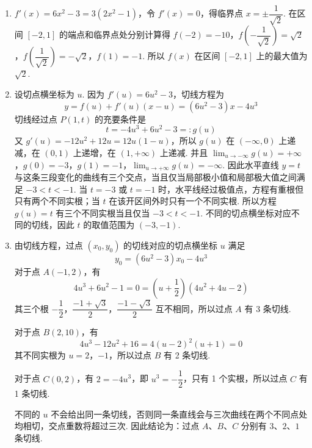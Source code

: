 \begin{solution}
\begin{enumerate}
\item \(f'(x)=6x^2-3=3(2x^2-1)\)，令 \(f'(x)=0\)，得临界点
\(x=\pm\dfrac{1}{\sqrt{2}}\). 在区间 \([-2,1]\) 的端点和临界点处分别计算得
\(f(-2)=-10\)，\(f\left(-\dfrac{1}{\sqrt{2}}\right)=\sqrt{2}\)，\(f\left(\dfrac{1}{\sqrt{2}}\right)=-\sqrt{2}\)，\(f(1)=-1\).
所以 \(f(x)\) 在区间 \([-2,1]\) 上的最大值为 \(\sqrt{2}\).

\item 设切点横坐标为 \(u\). 因为 \(f'(u)=6u^2-3\)，切线方程为
\[
y=f(u)+f'(u)(x-u)=(6u^2-3)x-4u^3
\]
切线经过点 \(P(1,t)\) 的充要条件是
\[
t=-4u^3+6u^2-3=:g(u)
\]
又 \(g'(u)=-12u^2+12u=12u(1-u)\)，所以 \(g(u)\) 在 \(\left(-\infty,0\right)\) 上递减，在 \((0,1)\) 上递增，在 \(\left(1,+\infty\right)\) 上递减. 并且
\(\lim_{u\to-\infty}g(u)=+\infty\)，\(g(0)=-3\)，\(g(1)=-1\)，\(\lim_{u\to+\infty}g(u)=-\infty\).
因此水平直线 \(y=t\) 与这条三段变化的曲线有三个交点，当且仅当局部极小值和局部极大值之间满足 \(-3<t<-1\). 当 \(t=-3\) 或 \(t=-1\) 时，水平线经过极值点，方程有重根但只有两个不同实根；当 \(t\) 在该开区间外时只有一个不同实根. 所以方程 \(g(u)=t\) 有三个不同实根当且仅当 \(-3<t<-1\). 不同的切点横坐标对应不同的切线，因此 \(t\) 的取值范围为 \((-3,-1)\).

\item 由切线方程，过点 \((x_0,y_0)\) 的切线对应的切点横坐标 \(u\) 满足
\[
y_0=(6u^2-3)x_0-4u^3
\]
对于点 \(A(-1,2)\)，有
\[
4u^3+6u^2-1=0=\left(u+\frac{1}{2}\right)\left(4u^2+4u-2\right)
\]
其三个根 \(-\dfrac{1}{2}\)，\(\dfrac{-1+\sqrt{3}}{2}\)，\(\dfrac{-1-\sqrt{3}}{2}\) 互不相同，所以过点 \(A\) 有 3 条切线.

对于点 \(B(2,10)\)，有
\[
4u^3-12u^2+16=4(u-2)^2(u+1)=0
\]
其不同实根为 \(u=2\)，\(-1\)，所以过点 \(B\) 有 2 条切线.

对于点 \(C(0,2)\)，有
\(2=-4u^3\)，即 \(u^3=-\dfrac{1}{2}\)，只有 1 个实根，所以过点 \(C\) 有 1 条切线.

不同的 \(u\) 不会给出同一条切线，否则同一条直线会与三次曲线在两个不同点处均相切，交点重数将超过三次. 因此结论为：过点 \(A\)、\(B\)、\(C\) 分别有 \(3\)、\(2\)、\(1\) 条切线.
\end{enumerate}
\end{solution}
